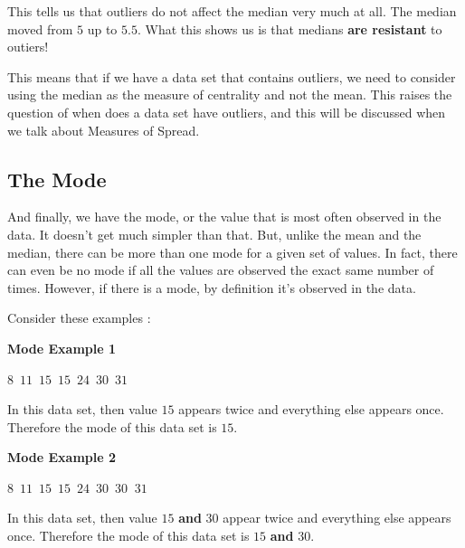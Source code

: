 \documentclass[
  letterpaper,
  DIV=11,
  numbers=noendperiod]{scrreprt}
\begin{document}
This tells us that outliers do not affect the median very much at all.
The median moved from \(5\) up to \(5.5\). What this shows us is that
medians \textbf{are resistant} to outiers!

\begin{tcolorbox}[enhanced jigsaw, colbacktitle=quarto-callout-important-color!10!white, colframe=quarto-callout-important-color-frame, opacitybacktitle=0.6, rightrule=.15mm, title=\textcolor{quarto-callout-important-color}{\faExclamation}\hspace{0.5em}{Important}, colback=white, coltitle=black, breakable, leftrule=.75mm, toptitle=1mm, bottomrule=.15mm, opacityback=0, bottomtitle=1mm, titlerule=0mm, left=2mm, toprule=.15mm, arc=.35mm]

This means that if we have a data set that contains outliers, we need to
consider using the median as the measure of centrality and not the mean.
This raises the question of when does a data set have outliers, and this
will be discussed when we talk about Measures of Spread.

\end{tcolorbox}

\subsection*{The Mode}\label{the-mode}

And finally, we have the mode, or the value that is most often observed
in the data. It doesn't get much simpler than that. But, unlike the mean
and the median, there can be more than one mode for a given set of
values. In fact, there can even be no mode if all the values are
observed the exact same number of times. However, if there is a mode, by
definition it's observed in the data.

Consider these examples :

\textbf{Mode Example 1}

\(8\,\,\, 11\,\,\,  15\,\,\,  15\,\,\,  24\,\,\,  30\,\,\,  31\)

In this data set, then value \(15\) appears twice and everything else
appears once. Therefore the mode of this data set is \(15\).

\textbf{Mode Example 2}

\(8\,\,\, 11\,\,\,  15\,\,\,  15\,\,\,  24\,\,\,  30\,\,\,  30\,\,\ 31\)

In this data set, then value \(15\) \textbf{and} \(30\) appear twice and
everything else appears once. Therefore the mode of this data set is
\(15\) \textbf{and} \(30\).
\end{document}
